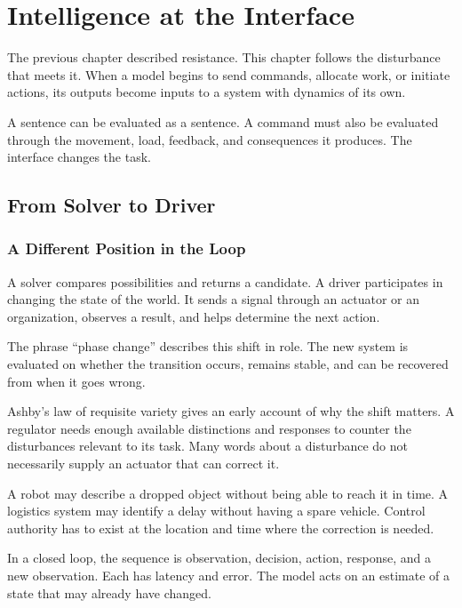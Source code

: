 \chapter{Intelligence at the Interface}

The previous chapter described resistance. This chapter follows the disturbance that meets it. When a model begins to send commands, allocate work, or initiate actions, its outputs become inputs to a system with dynamics of its own.

A sentence can be evaluated as a sentence. A command must also be evaluated through the movement, load, feedback, and consequences it produces. The interface changes the task.

\section{From Solver to Driver}

\subsection{A Different Position in the Loop}


A solver compares possibilities and returns a candidate. A driver participates in changing the state of the world. It sends a signal through an actuator or an organization, observes a result, and helps determine the next action.

The phrase “phase change” describes this shift in role. The new system is evaluated on whether the transition occurs, remains stable, and can be recovered from when it goes wrong.

Ashby's law of requisite variety gives an early account of why the shift matters.\cite{ashby1956cybernetics} A regulator needs enough available distinctions and responses to counter the disturbances relevant to its task. Many words about a disturbance do not necessarily supply an actuator that can correct it.

A robot may describe a dropped object without being able to reach it in time. A logistics system may identify a delay without having a spare vehicle. Control authority has to exist at the location and time where the correction is needed.


In a closed loop, the sequence is observation, decision, action, response, and a new observation. Each has latency and error. The model acts on an estimate of a state that may already have changed.

